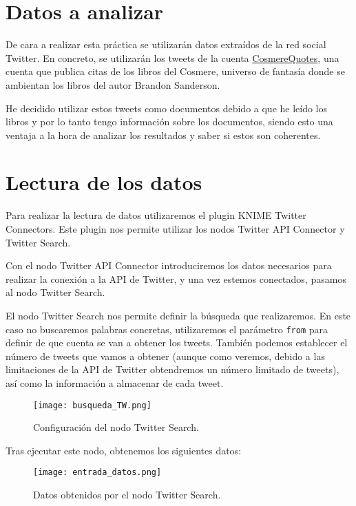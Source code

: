 \section{Datos a analizar}

De cara a realizar esta práctica se utilizarán datos extraídos de la red social Twitter. En concreto, se utilizarán los tweets de la cuenta \href{https://twitter.com/CosmereQuotes}{CosmereQuotes}, una cuenta que publica citas de los libros del Cosmere, universo de fantasía donde se ambientan los libros del autor Brandon Sanderson.

He decidido utilizar estos tweets como documentos debido a que he leído los libros y por lo tanto tengo información sobre los documentos, siendo esto una ventaja a la hora de analizar los resultados y saber si estos son coherentes.

\section{Lectura de los datos}

Para realizar la lectura de datos utilizaremos el plugin KNIME Twitter Connectors. Este plugin nos permite utilizar los nodos Twitter API Connector y Twitter Search.

Con el nodo Twitter API Connector introduciremos los datos necesarios para realizar la conexión a la API de Twitter, y una vez estemos conectados, pasamos al nodo Twitter Search.

El nodo Twitter Search nos permite definir la búsqueda que realizaremos. En este caso no buscaremos palabras concretas, utilizaremos el parámetro \texttt{from} para definir de que cuenta se van a obtener los tweets. También podemos establecer el número de tweets que vamos a obtener (aunque como veremos, debido a las limitaciones de la API de Twitter obtendremos un número limitado de tweets), así como la información a almacenar de cada tweet.

\begin{figure}[H]
	\centering
	\texttt{[image: busqueda\_TW.png]}
	\caption{Configuración del nodo Twitter Search.}
	\label{fig:busqueda_TW}
\end{figure}

Tras ejecutar este nodo, obtenemos los siguientes datos:

\begin{figure}[H]
	\centering
	\texttt{[image: entrada\_datos.png]}
	\caption{Datos obtenidos por el nodo Twitter Search.}
	\label{fig:entrada_datos}
\end{figure}


